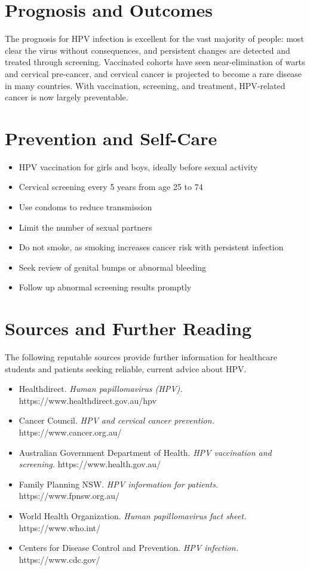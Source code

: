 \section*{Prognosis and Outcomes}
The prognosis for HPV infection is excellent for the vast majority of people: most clear the virus without consequences, and persistent changes are detected and treated through screening. Vaccinated cohorts have seen near-elimination of warts and cervical pre-cancer, and cervical cancer is projected to become a rare disease in many countries. With vaccination, screening, and treatment, HPV-related cancer is now largely preventable.

\section*{Prevention and Self-Care}
\begin{itemize}
    \item HPV vaccination for girls and boys, ideally before sexual activity
    \item Cervical screening every 5 years from age 25 to 74
    \item Use condoms to reduce transmission
    \item Limit the number of sexual partners
    \item Do not smoke, as smoking increases cancer risk with persistent infection
    \item Seek review of genital bumps or abnormal bleeding
    \item Follow up abnormal screening results promptly
\end{itemize}

\section*{Sources and Further Reading}
The following reputable sources provide further information for healthcare students and patients seeking reliable, current advice about HPV.

\begin{itemize}
    \item Healthdirect. \textit{Human papillomavirus (HPV).} https://www.healthdirect.gov.au/hpv
    \item Cancer Council. \textit{HPV and cervical cancer prevention.} https://www.cancer.org.au/
    \item Australian Government Department of Health. \textit{HPV vaccination and screening.} https://www.health.gov.au/
    \item Family Planning NSW. \textit{HPV information for patients.} https://www.fpnsw.org.au/
    \item World Health Organization. \textit{Human papillomavirus fact sheet.} https://www.who.int/
    \item Centers for Disease Control and Prevention. \textit{HPV infection.} https://www.cdc.gov/
\end{itemize}
